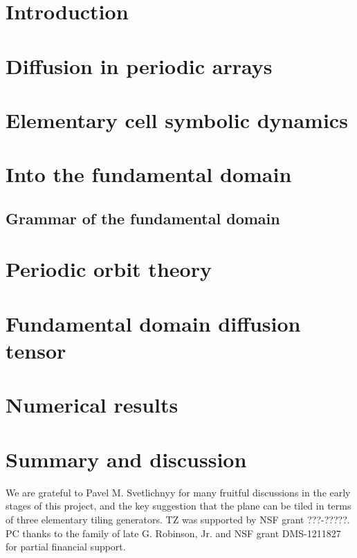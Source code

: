 \documentclass[aps,pre,
                showpacs,
                twocolumn,
                groupedaddress,
                floatfix]{revtex4-1}
\begin{document}
\section{Introduction}
\label{s-intro}
  

\section{Diffusion in periodic arrays}
\label{s-Lorentz}
  

\section{Elementary cell symbolic dynamics}
\label{s-elemCell}
  

\section{Into the fundamental domain}
\label{s-fundDom}
  

\subsection{Grammar of the fundamental domain}
\label{s-fundGramm}
  

\section{Periodic orbit theory}
\label{s-POT}
  

\section{Fundamental domain diffusion tensor}
\label{s-fundDiff}
  

\section{Numerical results}
\label{s-numerics}
  

\section{Summary and discussion}
\label{s-concl}
  

\begin{acknowledgments}
We are grateful to Pavel M. Svetlichnyy for many fruitful discussions in
the early stages of this project, and the key suggestion that the plane
can be tiled in terms of three elementary tiling generators.
TZ was supported by NSF grant ???-?????.
PC thanks to the family of late G. Robinson, Jr. and NSF grant
DMS-1211827 for partial financial support.
\end{acknowledgments}


% 


\ifboyscout
\eject  \newpage
    
    
 \newpage
    
\fi
\end{document}
